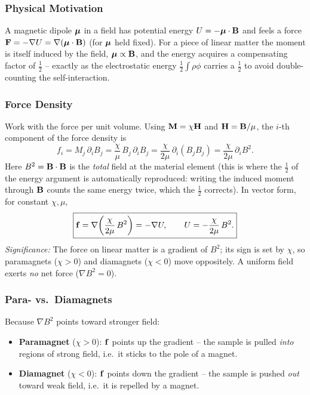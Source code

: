 \subsubsection*{Physical Motivation}
A magnetic dipole $\boldsymbol{\mu}$ in a field has potential energy $U=-\boldsymbol{\mu}\cdot\mathbf{B}$ and feels a
force $\mathbf{F}=-\nabla  U=\nabla (\boldsymbol{\mu}\cdot\mathbf{B})$ (for $\boldsymbol{\mu}$ held fixed). For a piece of
linear matter the moment is itself induced by the field, $\boldsymbol{\mu}\propto\mathbf{B}$, and the energy
acquires a compensating factor of $\tfrac12$ -- exactly as the electrostatic energy
$\tfrac12\int\rho\phi$ carries a $\tfrac12$ to avoid double-counting the
self-interaction.

\subsubsection*{Force Density}
Work with the force per unit volume. Using $\mathbf{M}=\chi\mathbf{H}$ and $\mathbf{H}=\mathbf{B}/\mu$, the
$i$-th component of the force density is
\begin{equation}\label{eq:lec18-fdensity-step}
  f_i=M_j\,\partial_i B_j
  =\frac{\chi}{\mu}\,B_j\,\partial_i B_j
  =\frac{\chi}{2\mu}\,\partial_i\!\left(B_j B_j\right)
  =\frac{\chi}{2\mu}\,\partial_i B^{2}.
\end{equation}
Here $B^2=\mathbf{B}\cdot\mathbf{B}$ is the \emph{total} field at the material element (this is where
the $\tfrac12$ of the energy argument is automatically reproduced: writing the induced
moment through $\mathbf{B}$ counts the same energy twice, which the $\tfrac12$ corrects).
In vector form, for constant $\chi,\mu$,
\begin{equation}\label{eq:lec18-force-boxed}
  \boxed{\mathbf{f}=\nabla \!\left(\frac{\chi}{2\mu}\,B^{2}\right)
  =-\nabla  U,\qquad
  U=-\frac{\chi}{2\mu}\,B^{2}.}
\end{equation}
\textit{Significance:} The force on linear matter is a gradient of $B^2$; its sign is set
by $\chi$, so paramagnets ($\chi>0$) and diamagnets ($\chi<0$) move oppositely. A uniform
field exerts \emph{no} net force ($\nabla  B^2=0$).

\subsubsection*{Para- vs.\ Diamagnets}
Because $\nabla  B^2$ points toward stronger field:
\begin{itemize}
  \item \textbf{Paramagnet} ($\chi>0$): $\mathbf{f}$ points up the gradient -- the sample is
        pulled \emph{into} regions of strong field, i.e.\ it sticks to the pole of a
        magnet.
  \item \textbf{Diamagnet} ($\chi<0$): $\mathbf{f}$ points down the gradient -- the sample
        is pushed \emph{out} toward weak field, i.e.\ it is repelled by a magnet.
\end{itemize}

